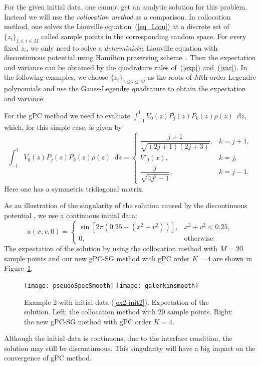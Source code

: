 \documentclass[12pt]{article}
\theoremstyle{plain}
\theoremstyle{remark}
\theoremstyle{remark}
\theoremstyle{remark}
\numberwithin{equation}{section}
\newcommand*\diff{\mathop{}\!\mathrm{d}}
\begin{document}
For the given initial data, one cannot get an analytic solution for this problem. Instead we will use the {\it collocation method} as a comparison. In collocation method, one solves the Liouville equation~(\ref{eq_Liou}) at a discrete set of $\{z_i\}_{1\leq i\leq M}$ called sample points in the corresponding random space. For every fixed $z_i$, we only need to solve a {\it deterministic} Liouville equation with discontinuous potential using Hamilton preserving scheme~\cite{Wen:2005ueba}. Then the expectation and variance can be obtained by the quadrature rules of~(\ref{exp}) and~(\ref{var}). In the following examples, we choose $\{z_i\}_{1\leq i\leq M}$ as the roots of $M$th order Legendre polynomials and use the Gauss-Legendre quadrature to obtain the expectation and variance.

For the gPC method we need to evaluate $\int_{-1}^1 V_0(z)P_j(z)P_k(z) \rho(z)\diff z$, which, for this simple case, is given by
\begin{equation}
  \int_{-1}^1 V_0(z)P_j(z)P_k(z) \rho(z)\diff z =
  \begin{cases}
    \dfrac{j+1}{\sqrt{(2j+1)(2j+3)}}, &k=j+1, \\
    V'_0(x), &k=j, \\
    \dfrac{j}{\sqrt{4j^2-1}}, &k=j-1.
  \end{cases}
\end{equation}
Here one has a symmetric tridiagonal matrix.

As an illustration of the singularity of the solution caused by the discontinuous potential , we use a continuous initial data:
\begin{equation}
  u(x,v,0)=
  \begin{cases}
  \sin[2\pi(0.25-(x^2+v^2))], &x^2+v^2<0.25, \\
  0, &\text{otherwise}.
  \end{cases}
\label{ex2-init2}
\end{equation}
The expectation of the solution by using the collocation method with $M=20$ sample points and our new gPC-SG method with gPC order $K=4$ are shown in Figure~\ref{8}. 
\begin{figure}[htbp]
  \texttt{[image: pseudoSpecSmooth]}
  \texttt{[image: galerkinsmooth]}
  \caption{Example 2 with initial data (\ref{ex2-init2}). Expectation of the solution. Left: the collocation method with $20$ sample points. Right: the new gPC-SG method with gPC order $K=4$.}
  \label{8}
\end{figure}
Although the initial data is continuous, due to the interface condition, the solution may still be discontinuous. This singularity will have a big impact on the convergence of gPC method.
\end{document}
